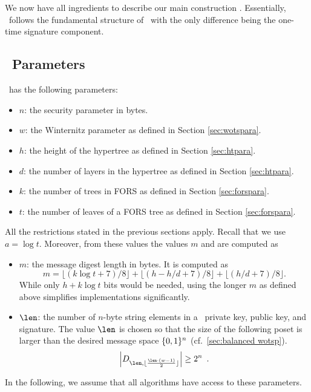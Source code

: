 \section{\SPHINCSA}
\label{sec:spx-core}
We now have all ingredients to describe our main construction \SPHINCSA. Essentially, \SPHINCSA\ follows the fundamental structure of \SPHINCSA\ with the only difference being the one-time signature component.

\subsection{\SPHINCSA\ Parameters}

\SPHINCSA\ has the following parameters:

\begin{itemize}

    \item $n$: the security parameter in bytes.

    \item $w$: the Winternitz parameter as defined in Section \ref{sec:wotspara}.
    
    \item $h$: the height of the hypertree as defined in Section \ref{sec:htpara}.
    
    \item $d$: the number of layers in the hypertree as defined in Section \ref{sec:htpara}.
    
    \item $k$: the number of trees in FORS as defined in Section \ref{sec:forspara}.
    
    \item $t$: the number of leaves of a FORS tree as defined in Section \ref{sec:forspara}.
    
\end{itemize}

All the restrictions stated in the previous sections apply. Recall that we use $a=\log t.$ Moreover, from these values the values $m$ and \len are computed as

\begin{itemize}
    \item $m$: the message digest length in bytes. It is computed as
    $$
    m=\lfloor(k\log t+7)/8\rfloor+\lfloor(h-h/d+7)/8\rfloor+\lfloor(h/d+7)/8\rfloor.
    $$
    While only $h+k\log t$ bits would be needed, using the longer $m$ as defined above simplifies implementations significantly.
    
    \item $\len$: the number of $n$-byte string elements in a \WOTSCS\ private key, public key, and signature. The value $\len$ is chosen so that the size of the following poset is larger than the desired message space $\{0,1\}^n$ (cf.~\cref{sec:balanced wotsp}).
    \[\left| D_{ \len, \lfloor \frac{\len \cdot (w-1)}{2} \rfloor } \right| \geq 2^n \enspace. \]

\end{itemize}
In the following, we assume that all algorithms have access to these parameters.

